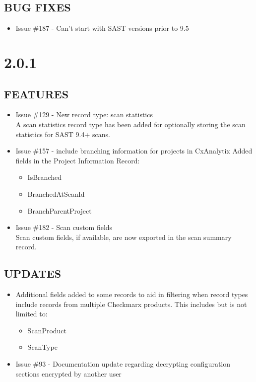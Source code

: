 \subsection*{BUG FIXES}
\begin{itemize}
    \item Issue \#187 - Can't start with SAST versions prior to 9.5
\end{itemize}

\section{2.0.1}

\subsection*{FEATURES}
    \begin{itemize}
        \item Issue \#129 - New record type: scan statistics\\
		\indent A scan statistics record type has been added for optionally storing the scan statistics for SAST 9.4+ scans.
	
        \item Issue \#157 - include branching information for projects in CxAnalytix
		\indent Added fields in the Project Information Record:
        \begin{itemize}
			\item IsBranched
			\item BranchedAtScanId
			\item BranchParentProject
        \end{itemize}
			
	    \item Issue \#182 - Scan custom fields\\
		\indent Scan custom fields, if available, are now exported in the scan summary record.    
    \end{itemize}

\subsection*{UPDATES}
    \begin{itemize}
        \item Additional fields added to some records to aid in filtering when record types include records from multiple Checkmarx products.  
        This includes but is not limited to:
        \begin{itemize}
            \item ScanProduct
            \item ScanType
        \end{itemize}
        \item Issue \#93 - Documentation update regarding decrypting configuration sections encrypted by another user
    \end{itemize}

